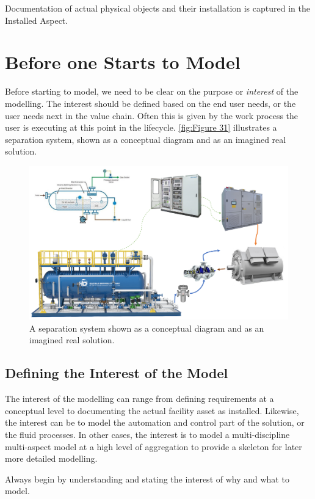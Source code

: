 \documentclass[../main.tex]{subfiles}
\begin{document}
Documentation of actual physical objects and their installation is captured in the Installed Aspect.

\section{Before one Starts to Model}
Before starting to model, we need to be clear on the purpose or \emph{interest} of the
modelling. The interest should be defined based on the end user needs, or the user needs next in the value chain.
Often this is given by the work process the user is executing at this point in the lifecycle. \autoref{fig:Figure 31} illustrates
a separation system, shown as a conceptual diagram and as an imagined real solution.

\begin{figure}[htb]
  \centering
  \includegraphics[width=1\textwidth]{img/IMFmanual-img050.png}
  \caption{A separation system shown as a conceptual diagram and as an imagined real solution.}
  \label{fig:Figure 31}
\end{figure}

\subsection{Defining the Interest of the Model}
The interest of the modelling can range from defining requirements at a conceptual level to documenting the actual facility asset as installed. Likewise, the interest can be to model the automation and
control part of the solution, or the fluid processes. In other cases, the interest is to model a multi-discipline
multi-aspect model at a high level of aggregation to provide a skeleton for later more detailed modelling.

Always begin by understanding and stating the interest of why and what to model.
\end{document}
